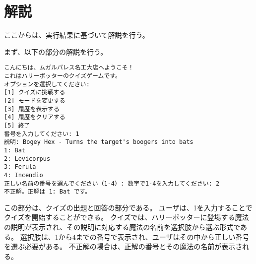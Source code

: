 \documentclass[uplatex,dvipdfmx,a4paper]{jsarticle}
\begin{document}
\section{解説}

ここからは、実行結果に基づいて解説を行う。
\par まず、以下の部分の解説を行う。
\begin{lstlisting}[style=result]
  こんにちは、ムガルパレス名工大店へようこそ！
これはハリーポッターのクイズゲームです。
オプションを選択してください:
[1] クイズに挑戦する
[2] モードを変更する
[3] 履歴を表示する
[4] 履歴をクリアする
[5] 終了
番号を入力してください: 1
説明: Bogey Hex - Turns the target's boogers into bats
1: Bat
2: Levicorpus
3: Ferula
4: Incendio
正しい名前の番号を選んでください（1-4）: 数字で1-4を入力してください: 2
不正解。正解は 1: Bat です。
\end{lstlisting}
この部分は、クイズの出題と回答の部分である。
ユーザは、1を入力することでクイズを開始することができる。
クイズでは、ハリーポッターに登場する魔法の説明が表示され、その説明に対応する魔法の名前を選択肢から選ぶ形式である。
選択肢は、1から4までの番号で表示され、ユーザはその中から正しい番号を選ぶ必要がある。
不正解の場合は、正解の番号とその魔法の名前が表示される。
\end{document}
